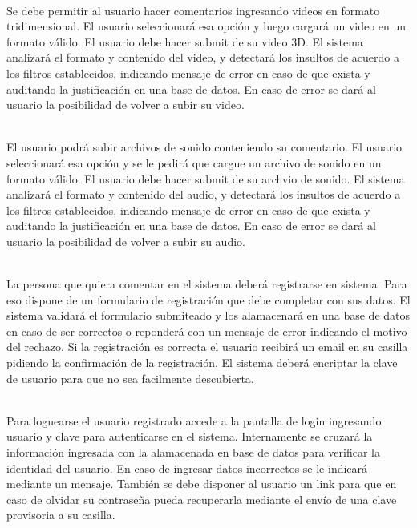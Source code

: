 {\\
Se debe permitir al usuario hacer comentarios ingresando videos en formato tridimensional.
El usuario seleccionará esa opción y luego cargará un video en un formato válido. El usuario debe hacer submit de su video 3D.
El sistema analizará el formato y contenido del video, y detectará los insultos de acuerdo a los filtros establecidos, indicando mensaje de error en caso de que exista y auditando la justificación en una base de datos.
En caso de error se dará al usuario la posibilidad de volver a subir su video.
                  
\\
El usuario podrá subir archivos de sonido conteniendo su comentario.
El usuario seleccionará esa opción y se le pedirá que cargue un archivo de sonido en un formato válido. El usuario debe hacer submit de su archvio de sonido.
El sistema analizará el formato y contenido del audio, y detectará los insultos de acuerdo a los filtros establecidos, indicando mensaje de error en caso de que exista y auditando la justificación en una base de datos.
En caso de error se dará al usuario la posibilidad de volver a subir su audio.

\\
La persona que quiera comentar en el sistema deberá registrarse en sistema. Para eso dispone de un formulario de registración que debe completar con sus datos. El sistema validará el formulario submiteado y los alamacenará en una base de datos en caso de ser correctos o reponderá con un mensaje de error indicando el motivo del rechazo. Si la registración es correcta el usuario recibirá un email en su casilla pidiendo la confirmación de la registración. El sistema deberá encriptar la clave de usuario para que no sea facilmente descubierta.

\\
Para loguearse el usuario registrado accede a la pantalla de login ingresando usuario y clave para autenticarse en el sistema. Internamente se cruzará la información ingresada con la alamacenada en base de datos para verificar la identidad del usuario. En caso de ingresar datos incorrectos se le indicará mediante un mensaje. También se debe disponer al usuario un link para que en caso de olvidar su contraseña pueda recuperarla mediante el envío de una clave provisoria a su casilla.

}
